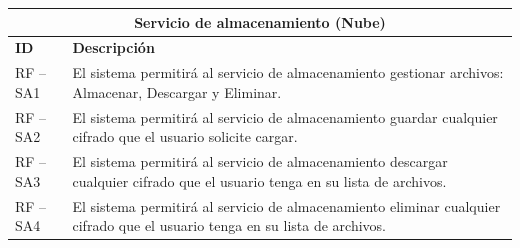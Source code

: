 \begin{table}[htb]
\centering
\begin{tabular}{| p{2cm} |  p{13.5cm} |}
\hline
\multicolumn{2}{|c|}{\textbf{Servicio de almacenamiento (Nube)}} \\ \hline
\textbf{ID} &  \textbf{Descripción} \\
\hline \hline
RF – SA1 & El sistema permitirá al servicio de almacenamiento gestionar archivos: Almacenar, Descargar y Eliminar.\\ \hline
RF – SA2 & El sistema permitirá al servicio de almacenamiento guardar cualquier cifrado que el usuario solicite cargar. \\ \hline
RF – SA3 & El sistema permitirá al servicio de almacenamiento descargar cualquier cifrado que el usuario tenga en su lista de archivos. \\ \hline
RF – SA4 & El sistema permitirá al servicio de almacenamiento eliminar cualquier cifrado que el usuario tenga en su lista de archivos. \\ \hline

\end{tabular}
\end{table}
